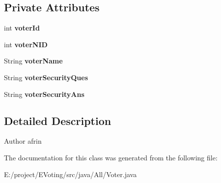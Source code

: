\subsection*{Private Attributes}
\begin{DoxyCompactItemize}
\item 
\mbox{\label{class_models_1_1_voter_a45969c6640284e21172309e73ddf4325}} 
int {\bfseries voter\+Id}
\item 
\mbox{\label{class_models_1_1_voter_a60a3610caecd7aced220566975a22a39}} 
int {\bfseries voter\+N\+ID}
\item 
\mbox{\label{class_models_1_1_voter_afc6a3e8b377fb543b58a85e02fd6bcc4}} 
String {\bfseries voter\+Name}
\item 
\mbox{\label{class_models_1_1_voter_a2d4fd518cce8ac1036e0ad161e5a7bee}} 
String {\bfseries voter\+Security\+Ques}
\item 
\mbox{\label{class_models_1_1_voter_a8d3752b3075e272d63ab1376b70ff23f}} 
String {\bfseries voter\+Security\+Ans}
\end{DoxyCompactItemize}


\subsection{Detailed Description}
\begin{DoxyAuthor}{Author}
afrin 
\end{DoxyAuthor}


The documentation for this class was generated from the following file\+:\begin{DoxyCompactItemize}
\item 
E\+:/project/\+E\+Voting/src/java/\+All/Voter.\+java\end{DoxyCompactItemize}

